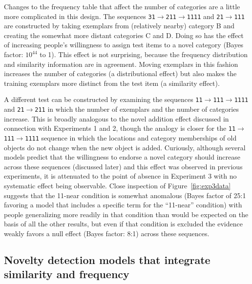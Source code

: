 \documentclass[doc]{apa6}
\newcommand{\dist}[1]{\texttt{#1}}
\newcommand{\goesto}{$\rightarrow$}
\begin{document}
Changes to the frequency table that affect the number of categories are a little more complicated in this design. The sequences \dist{31}\goesto\dist{211}\goesto\dist{1111} and \dist{21}\goesto\dist{111} are constructed by taking exemplars from (relatively nearby) category B and creating the somewhat more distant categories C and D. Doing so has the effect of increasing people's willingness to assign test items to a novel category (Bayes factor: $10^{44}$ to 1). This effect is not surprising, because the frequency distribution and similarity information are in agreement. Moving exemplars in this fashion increases the number of categories (a distributional effect) but also makes the training exemplars more distinct from the test item (a similarity effect).

A different test can be constructed by examining the sequences \dist{11}\goesto\dist{111}\goesto\dist{1111} and \dist{21}\goesto\dist{211} in which  the number of exemplars and the number of categories increase. This is broadly analogous to the novel addition effect discussed in connection with Experiments 1 and 2, though the analogy is closer for the \dist{11}\goesto\dist{111}\goesto\dist{1111} sequence in which the locations and category memberships of old objects do not change when the new object is added. Curiously, although several models predict that the willingness to endorse a novel category should increase across these sequences (discussed later) and this effect was observed in previous experiments, it is attenuated to the point of absence in Experiment 3 with no systematic effect being observable. Close inspection of Figure~\ref{fig:exp3data} suggests that the 11-near condition is somewhat anomalous (Bayes factor of 25:1 favoring a model that includes a specific term for the ``11-near'' condition) with people generalizing more readily in that condition than would be expected on the basis of all the other results, but even if that condition is excluded the evidence weakly favors a null effect (Bayes factor: 8:1) across these sequences.

\subsection{Novelty detection models that integrate similarity and frequency}
\end{document}
